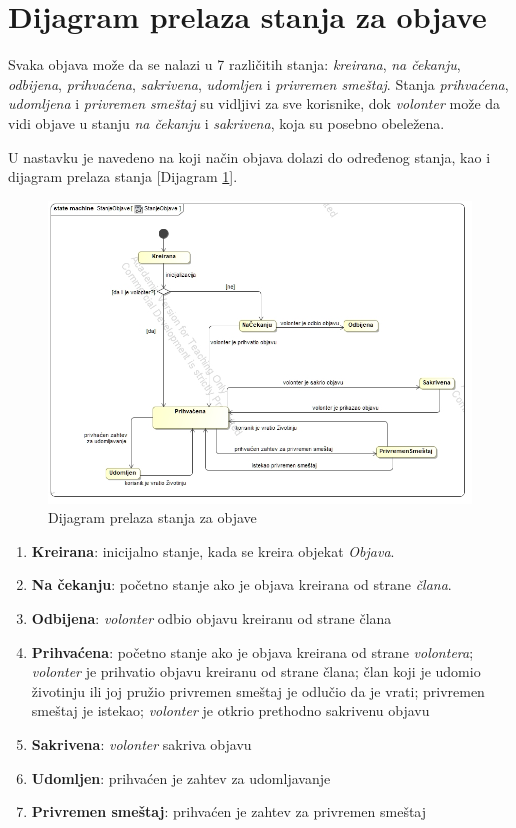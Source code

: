 \section{Dijagram prelaza stanja za objave}
\par Svaka objava može da se nalazi u 7 različitih stanja: \textit{kreirana}, \textit{na čekanju}, \textit{odbijena},
\textit{prihvaćena}, \textit{sakrivena}, \textit{udomljen} i \textit{privremen smeštaj}. 
Stanja \textit{prihvaćena}, \textit{udomljena} i \textit{privremen smeštaj} su vidljivi za sve korisnike,
dok \textit{volonter} može da vidi objave u stanju \textit{na čekanju} i \textit{sakrivena}, koja su posebno obeležena.
\par U nastavku je navedeno na koji način objava dolazi do određenog stanja, kao i dijagram prelaza stanja [Dijagram \ref{fig:state}].
\begin{figure}[h]
    \centering
    \includegraphics[width=\textwidth]{img/state.jpg}
    \caption{Dijagram prelaza stanja za objave}
    \label{fig:state}
\end{figure}
\begin{enumerate}
    \item \textbf{Kreirana}: inicijalno stanje, kada se kreira objekat \textit{Objava}.
    \item \textbf{Na čekanju}: početno stanje ako je objava kreirana od strane \textit{člana}.
    \item \textbf{Odbijena}: \textit{volonter} odbio objavu kreiranu od strane člana
    \item \textbf{Prihvaćena}: 
        početno stanje ako je objava kreirana od strane \textit{volontera}; 
        \textit{volonter} je prihvatio objavu kreiranu od strane člana;
        član koji je udomio životinju ili joj pružio privremen smeštaj je odlučio da je vrati;
        privremen smeštaj je istekao;
        \textit{volonter} je otkrio prethodno sakrivenu objavu
    \item \textbf{Sakrivena}: \textit{volonter} sakriva objavu
    \item \textbf{Udomljen}: prihvaćen je zahtev za udomljavanje
    \item \textbf{Privremen smeštaj}: prihvaćen je zahtev za privremen smeštaj
\end{enumerate}

